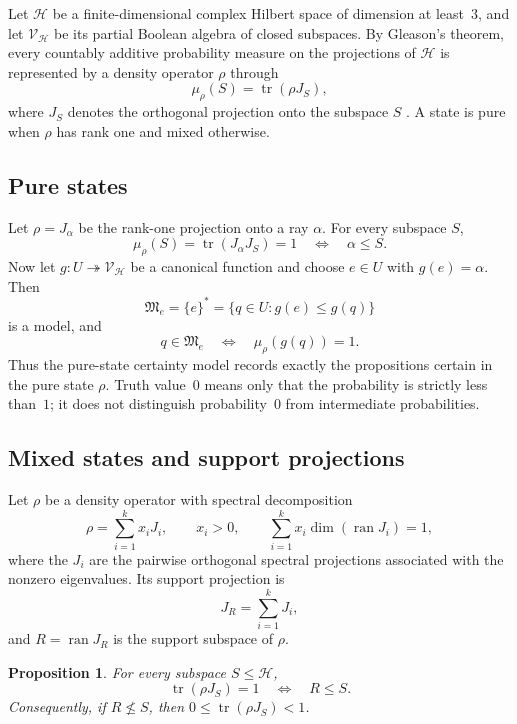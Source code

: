 \documentclass{article}   	%
\theoremstyle{plain}
\newtheorem{proposition}[theorem]{Proposition}
\theoremstyle{definition}
\theoremstyle{remark}
\begin{document}
Let $\mathcal H$ be a finite-dimensional complex Hilbert space of dimension at
least~$3$, and let $\mathcal V_{\mathcal H}$ be its partial Boolean algebra of
closed subspaces.
By Gleason's theorem, every countably additive probability measure on the
projections of $\mathcal H$ is represented by a density operator $\rho$ through
\[
\mu_\rho(S)=\operatorname{tr}(\rho J_S),
\]
where $J_S$ denotes the orthogonal projection onto the subspace $S$
\cite{Gleason1957}.
A state is pure when $\rho$ has rank one and mixed otherwise.

\subsection{Pure states}
\label{subsec:pure}

Let $\rho=J_\alpha$ be the rank-one projection onto a ray $\alpha$.
For every subspace $S$,
\[
\mu_\rho(S)=\operatorname{tr}(J_\alpha J_S)=1
\quad\Longleftrightarrow\quad
\alpha\le S.
\]
Now let $g:U\twoheadrightarrow\mathcal V_{\mathcal H}$ be a canonical function
and choose $e\in U$ with $g(e)=\alpha$.
Then
\[
\mathfrak M_e=\{e\}^*
=\{q\in U:g(e)\le g(q)\}
\]
is a model, and
\[
q\in\mathfrak M_e
\quad\Longleftrightarrow\quad
\mu_\rho(g(q))=1.
\]
Thus the pure-state certainty model records exactly the propositions certain in
the pure state $\rho$.
Truth value~$0$ means only that the probability is strictly less than~$1$; it
does not distinguish probability~$0$ from intermediate probabilities.

\subsection{Mixed states and support projections}
\label{subsec:mixed}

Let $\rho$ be a density operator with spectral decomposition
\begin{equation}
\label{eq:spectral}
\rho=\sum_{i=1}^k x_iJ_i,
\qquad x_i>0,
\qquad \sum_{i=1}^k x_i\dim(\operatorname{ran}J_i)=1,
\end{equation}
where the $J_i$ are the pairwise orthogonal spectral projections associated with
the nonzero eigenvalues.
Its support projection is
\[
J_R=\sum_{i=1}^k J_i,
\]
and $R=\operatorname{ran}J_R$ is the support subspace of $\rho$.

\begin{proposition}
\label{prop:mix}
For every subspace $S\le\mathcal H$,
\[
\operatorname{tr}(\rho J_S)=1
\quad\Longleftrightarrow\quad
R\le S.
\]
Consequently, if $R\not\le S$, then
$0\le\operatorname{tr}(\rho J_S)<1$.
\end{proposition}
\end{document}
